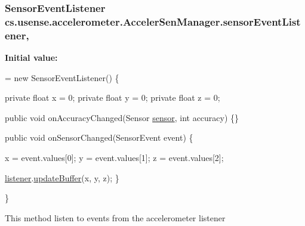 \subsubsection[{sensor\+Event\+Listener}]{\setlength{\rightskip}{0pt plus 5cm}Sensor\+Event\+Listener cs.\+usense.\+accelerometer.\+Acceler\+Sen\+Manager.\+sensor\+Event\+Listener\hspace{0.3cm}{\ttfamily [static]}, {\ttfamily [private]}}\label{classcs_1_1usense_1_1accelerometer_1_1_acceler_sen_manager_a84a1a9276e1f31ea8f0bcec849fa8b1c}
{\bfseries Initial value\+:}
\begin{DoxyCode}
=
            \textcolor{keyword}{new} SensorEventListener() \{

        \textcolor{keyword}{private} \textcolor{keywordtype}{float} x = 0;
        \textcolor{keyword}{private} \textcolor{keywordtype}{float} y = 0;
        \textcolor{keyword}{private} \textcolor{keywordtype}{float} z = 0;

        \textcolor{keyword}{public} \textcolor{keywordtype}{void} onAccuracyChanged(Sensor \hyperlink{classcs_1_1usense_1_1accelerometer_1_1_acceler_sen_manager_a3c7fbe02cf84f49c2e86d54bea076a52}{sensor}, \textcolor{keywordtype}{int} accuracy) \{\}

        \textcolor{keyword}{public} \textcolor{keywordtype}{void} onSensorChanged(SensorEvent event) \{

            x = \textcolor{keyword}{event}.values[0];
            y = \textcolor{keyword}{event}.values[1];
            z = \textcolor{keyword}{event}.values[2];

            \hyperlink{classcs_1_1usense_1_1accelerometer_1_1_acceler_sen_manager_a278bf3a86e3b16f38808b6956e3ece8d}{listener}.\hyperlink{interfacecs_1_1usense_1_1accelerometer_1_1_accelerometer_listener_a0cb07e6b7168b1e1901a0dae51394372}{updateBuffer}(x, y, z);
        \}

    \}
\end{DoxyCode}
This method listen to events from the accelerometer listener \hypertarget{classcs_1_1usense_1_1accelerometer_1_1_acceler_sen_manager_ae61bba99e8cd255020dbe54154ec9b16}{}
